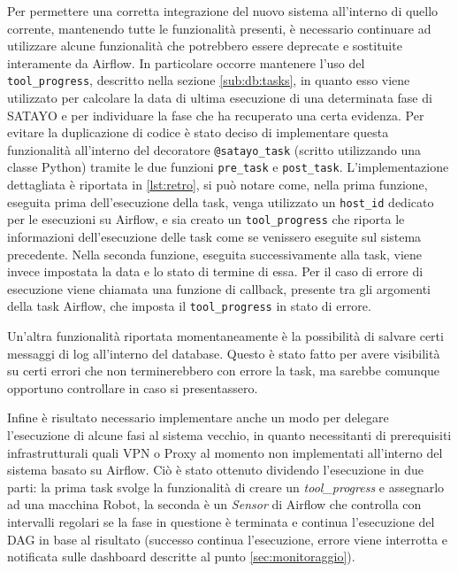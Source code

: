 Per permettere una corretta integrazione del nuovo sistema all'interno di quello
corrente, mantenendo tutte le funzionalità presenti, è necessario continuare ad utilizzare
alcune funzionalità che potrebbero essere deprecate e sostituite interamente da Airflow.
In particolare occorre mantenere l'uso del \texttt{tool\_progress}, descritto
nella sezione \ref{sub:db:tasks}, in quanto esso viene utilizzato per calcolare la
data di ultima esecuzione di una determinata fase di SATAYO e per individuare la
fase che ha recuperato una certa evidenza. Per evitare la duplicazione di codice
è stato deciso di implementare questa funzionalità all'interno del decoratore
\texttt{@satayo\_task} (scritto utilizzando una classe Python) tramite le due funzioni
\texttt{pre\_task} e \texttt{post\_task}. L'implementazione dettagliata è
riportata in \ref{lst:retro}, si può notare come, nella prima funzione, eseguita
prima dell'esecuzione della task, venga utilizzato un \texttt{host\_id} dedicato
per le esecuzioni su Airflow, e sia creato un \texttt{tool\_progress} che riporta
le informazioni dell'esecuzione delle task come se venissero eseguite sul sistema
precedente. Nella seconda funzione, eseguita successivamente alla task, viene
invece impostata la data e lo stato di termine di essa. Per il caso di errore di
esecuzione viene chiamata una funzione di callback, presente tra gli argomenti
della task Airflow, che imposta il \texttt{tool\_progress} in stato di errore.

Un'altra funzionalità riportata momentaneamente è la possibilità di salvare
certi messaggi di log all'interno del database. Questo è stato fatto per avere visibilità
su certi errori che non terminerebbero con errore la task, ma sarebbe comunque
opportuno controllare in caso si presentassero.

Infine è risultato necessario implementare anche un modo per delegare l'esecuzione
di alcune fasi al sistema vecchio, in quanto necessitanti di prerequisiti infrastrutturali
quali VPN o Proxy al momento non implementati all'interno del sistema basato su Airflow.
Ciò è stato ottenuto dividendo l'esecuzione in due parti: la prima task svolge la
funzionalità di creare un \textit{tool\_progress} e assegnarlo ad una macchina
Robot, la seconda è un \textit{Sensor} di Airflow che controlla con intervalli
regolari se la fase in questione è terminata e continua l'esecuzione del DAG in
base al risultato (successo continua l'esecuzione, errore viene interrotta e
notificata sulle dashboard descritte al punto \ref{sec:monitoraggio}).

